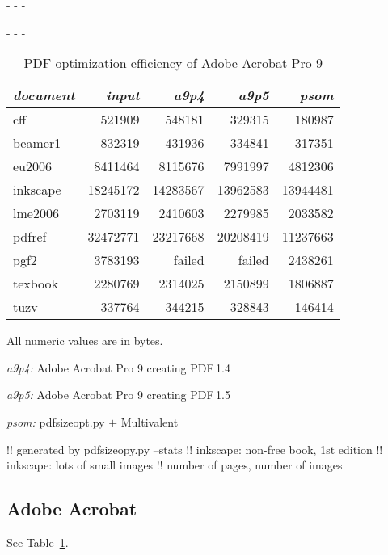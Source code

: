 \documentclass{ltugproc}
\def\cmd{\textsf}
\def\captiontop#1{%
  \advance\abovecaptionskip-\belowcaptionskip
  \advance\belowcaptionskip\abovecaptionskip
  \advance\abovecaptionskip-\belowcaptionskip
  \abovecaptionskip-\abovecaptionskip
  \caption{#1}%
  \advance\abovecaptionskip-\belowcaptionskip
  \advance\belowcaptionskip\abovecaptionskip
  \advance\abovecaptionskip-\belowcaptionskip
  \abovecaptionskip-\abovecaptionskip
}
\begin{document}
\begin{table}
\captiontop{PDF optimization efficiency
of Adobe Acrobat Pro 9}\label{tab:eff-a9}
\par\small\noindent\hfil
\advance\tabcolsep-2pt  %
\begin{tabular}{@{}lrrrr@{}}
\toprule
\emph{document} & \emph{input} & \emph{a9p4} & \emph{a9p5} & \emph{psom} \\\midrule
cff         &   521909 &   548181 &   329315 &   180987 \\
beamer1     &   832319 &   431936 &   334841 &   317351 \\
eu2006      &  8411464 &  8115676 &  7991997 &  4812306 \\
inkscape    & 18245172 & 14283567 & 13962583 & 13944481 \\
lme2006     &  2703119 &  2410603 &  2279985 &  2033582 \\
pdfref      & 32472771 & 23217668 & 20208419 & 11237663 \\
pgf2        &  3783193 &   failed &   failed &  2438261 \\
texbook     &  2280769 &  2314025 &  2150899 &  1806887 \\
tuzv        &   337764 &   344215 &   328843 &   146414 \\
\bottomrule
\end{tabular}
\par\bigskip
\par\noindent All numeric values are in bytes.
\par\noindent\emph{a9p4:} Adobe Acrobat Pro 9 creating PDF\,1.4
\par\noindent\emph{a9p5:} Adobe Acrobat Pro 9 creating PDF\,1.5
\par\noindent\emph{psom:} \cmd{pdfsizeopt.py} $+$ Multivalent
\end{table}



!! generated by pdfsizeopy.py --stats
!! inkscape: non-free book, 1st edition
!! inkscape: lots of small images
!! number of pages, number of images

\subsection{Adobe Acrobat}

See Table~\ref{tab:eff-a9}.
\end{document}
